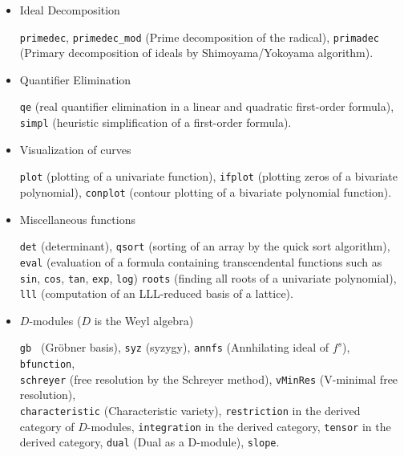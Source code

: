 \documentclass[12pt]{article}
\begin{document}
\begin{itemize}
{\tt dp\_gr\_main }, {\tt nd\_gr\_trace} (Groebner basis computation of a polynomial ideal
over the rationals by the trace lifting),
{\tt dp\_gr\_mod\_main }, {\tt nd\_gr} (Groebner basis over small finite fields),
{\tt tolex } (Modular change of ordering for a zero-dimensional ideal),
{\tt tolex\_gsl } (Modular rational univariate representation
for a zero-dimensional ideal),
{\tt dp\_f4\_main}, {\tt dp\_f4\_mod\_main}, {\tt nd\_f4} 
($F_4$ over the rationals and small finite fields).

\item Ideal Decomposition

{\tt primedec}, {\tt primedec\_mod} (Prime decomposition of the radical),
{\tt primadec} (Primary decomposition of ideals by Shimoyama/Yokoyama algorithm).

\item Quantifier Elimination

{\tt qe} (real quantifier elimination in a linear and
quadratic first-order formula),
{\tt simpl} (heuristic simplification of a first-order formula).

\item Visualization of curves

{\tt plot} (plotting of a univariate function),
{\tt ifplot} (plotting zeros of a bivariate polynomial),
{\tt conplot} (contour plotting of a bivariate polynomial function).

\item Miscellaneous functions

{\tt det} (determinant),
{\tt qsort} (sorting of an array by the quick sort algorithm),
{\tt eval} (evaluation of a formula containing transcendental functions
such as
{\tt sin}, {\tt cos}, {\tt tan}, {\tt exp},
{\tt log})
{\tt roots} (finding all roots of a univariate polynomial),
{\tt lll} (computation of an LLL-reduced basis of a lattice).

\item $D$-modules ($D$ is the Weyl algebra)

{\tt gb } (Gr\"obner basis),
{\tt syz} (syzygy),
{\tt annfs} (Annhilating ideal of $f^s$),
{\tt bfunction},\\
{\tt schreyer} (free resolution by the Schreyer method),
{\tt vMinRes} (V-minimal free resolution),\\
{\tt characteristic} (Characteristic variety),
{\tt restriction} in the derived category of $D$-modules,
{\tt integration} in the derived category,
{\tt tensor}  in the derived category,
{\tt dual} (Dual as a D-module),
{\tt slope}.


\end{itemize}
\end{document}
